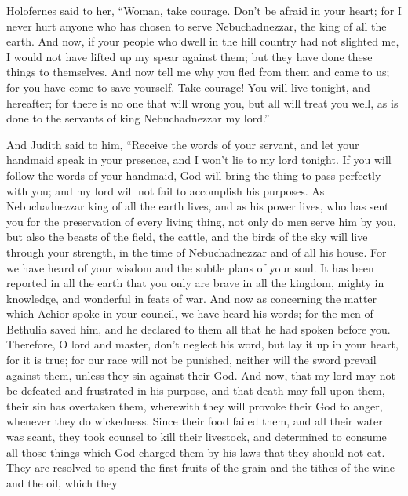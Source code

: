  Holofernes said to her, ``Woman, take courage. Don't be
afraid in your heart; for I never hurt anyone who has chosen to serve
Nebuchadnezzar, the king of all the earth.  And now, if
your people who dwell in the hill country had not slighted me, I would
not have lifted up my spear against them; but they have done these
things to themselves.  And now tell me why you fled from
them and came to us; for you have come to save yourself. Take courage!
You will live tonight, and hereafter;  for there is no one
that will wrong you, but all will treat you well, as is done to the
servants of king Nebuchadnezzar my lord.''

 And Judith said to him, ``Receive the words of your
servant, and let your handmaid speak in your presence, and I won't lie
to my lord tonight.  If you will follow the words of your
handmaid, God will bring the thing to pass perfectly with you; and my
lord will not fail to accomplish his purposes.  As
Nebuchadnezzar king of all the earth lives, and as his power lives, who
has sent you for the preservation of every living thing, not only do men
serve him by you, but also the beasts of the field, the cattle, and the
birds of the sky will live through your strength, in the time of
Nebuchadnezzar and of all his house.  For we have heard of
your wisdom and the subtle plans of your soul. It has been reported in
all the earth that you only are brave in all the kingdom, mighty in
knowledge, and wonderful in feats of war.  And now as
concerning the matter which Achior spoke in your council, we have heard
his words; for the men of Bethulia saved him, and he declared to them
all that he had spoken before you.  Therefore, O lord and
master, don't neglect his word, but lay it up in your heart, for it is
true; for our race will not be punished, neither will the sword prevail
against them, unless they sin against their God.  And
now, that my lord may not be defeated and frustrated in his purpose, and
that death may fall upon them, their sin has overtaken them, wherewith
they will provoke their God to anger, whenever they do wickedness.
 Since their food failed them, and all their water was
scant, they took counsel to kill their livestock, and determined to
consume all those things which God charged them by his laws that they
should not eat.  They are resolved to spend the first
fruits of the grain and the tithes of the wine and the oil, which they
